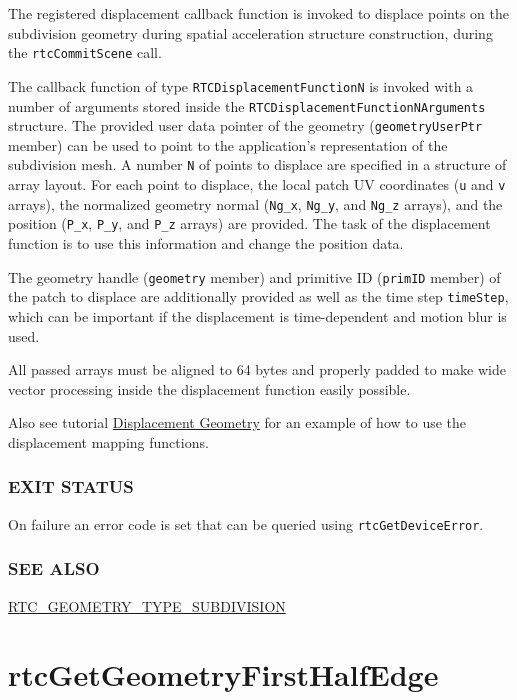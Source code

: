 The registered displacement callback function is invoked to displace
points on the subdivision geometry during spatial acceleration structure
construction, during the \texttt{rtcCommitScene} call.

The callback function of type \texttt{RTCDisplacementFunctionN} is
invoked with a number of arguments stored inside the
\texttt{RTCDisplacementFunctionNArguments} structure. The provided user
data pointer of the geometry (\texttt{geometryUserPtr} member) can be
used to point to the application's representation of the subdivision
mesh. A number \texttt{N} of points to displace are specified in a
structure of array layout. For each point to displace, the local patch
UV coordinates (\texttt{u} and \texttt{v} arrays), the normalized
geometry normal (\texttt{Ng\_x}, \texttt{Ng\_y}, and \texttt{Ng\_z}
arrays), and the position (\texttt{P\_x}, \texttt{P\_y}, and
\texttt{P\_z} arrays) are provided. The task of the displacement
function is to use this information and change the position data.

The geometry handle (\texttt{geometry} member) and primitive ID
(\texttt{primID} member) of the patch to displace are additionally
provided as well as the time step \texttt{timeStep}, which can be
important if the displacement is time-dependent and motion blur is used.

All passed arrays must be aligned to 64 bytes and properly padded to
make wide vector processing inside the displacement function easily
possible.

Also see tutorial \hyperref[displacement-geometry]{Displacement
Geometry} for an example of how to use the displacement mapping
functions.

\subsubsection{EXIT STATUS}\label{exit-status}

On failure an error code is set that can be queried using
\texttt{rtcGetDeviceError}.

\subsubsection{SEE ALSO}\label{see-also}

\hyperref[rtc_geometry_type_subdivision]{RTC\_GEOMETRY\_TYPE\_SUBDIVISION}

\pagebreak

\section{rtcGetGeometryFirstHalfEdge}\label{rtcgetgeometryfirsthalfedge}

